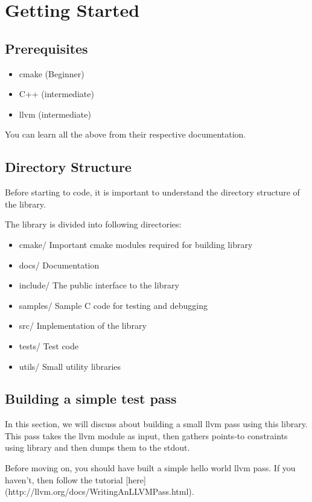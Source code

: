 \section{Getting Started}

\subsection{Prerequisites}
\begin{itemize}
    \item cmake (Beginner)
    \item C++ (intermediate)
    \item llvm (intermediate)
\end{itemize}

You can learn all the above from their respective documentation.

\subsection{Directory Structure}
Before starting to code, it is important to understand the directory structure of the library.

The library is divided into following directories:

\begin{itemize}
  \item cmake/      Important cmake modules required for building library
  \item docs/       Documentation
  \item include/    The public interface to the library
  \item samples/    Sample C code for testing and debugging
  \item src/        Implementation of the library
  \item tests/      Test code
  \item utils/      Small utility libraries
\end{itemize}

\subsection{Building a simple test pass}
In this section, we will discuss about building a small llvm pass using this
library. This pass takes the llvm module as input, then gathers points-to
constraints using library and then dumps them to the stdout.

Before moving on, you should have built a simple hello world llvm pass. If you
haven't, then follow the tutorial [here](http://llvm.org/docs/WritingAnLLVMPass.html).

